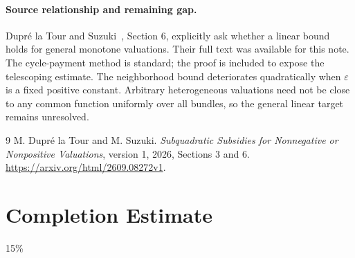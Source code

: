 \documentclass[11pt]{article}
\theoremstyle{definition}
\theoremstyle{remark}
\begin{document}
\paragraph{Source relationship and remaining gap.}
Dupr\'e la Tour and Suzuki~\cite{source}, Section 6, explicitly ask whether a linear bound holds for general monotone valuations. Their full text was available for this note. The cycle-payment method is standard; the proof is included to expose the telescoping estimate. The neighborhood bound deteriorates quadratically when $\varepsilon$ is a fixed positive constant. Arbitrary heterogeneous valuations need not be close to any common function uniformly over all bundles, so the general linear target remains unresolved.

\begin{thebibliography}{9}
 M. Dupr\'e la Tour and M. Suzuki.
\emph{Subquadratic Subsidies for Nonnegative or Nonpositive Valuations}, version 1, 2026, Sections 3 and 6.
\url{https://arxiv.org/html/2609.08272v1}.
\end{thebibliography}

\section{Completion Estimate}
15\%
\end{document}
